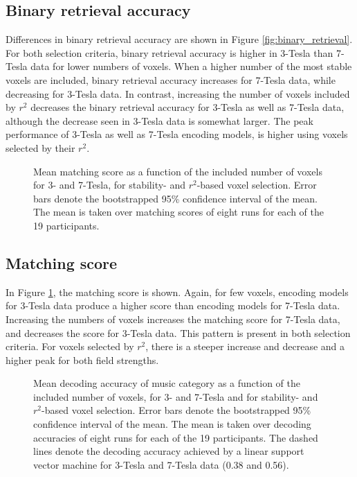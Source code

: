 \subsection*{Binary retrieval accuracy}

Differences in binary retrieval accuracy are shown in Figure \ref{fig:binary_retrieval}. For both selection criteria, binary retrieval
accuracy is higher in 3-Tesla than 7-Tesla data for lower numbers of voxels.
When a higher number of the most stable voxels are included, binary retrieval accuracy increases for 7-Tesla data, while decreasing for 3-Tesla data.    
In contrast, increasing the number of voxels included by $r^2$ decreases the
binary retrieval accuracy for 3-Tesla as well as 7-Tesla data, although the
decrease seen in 3-Tesla data is somewhat larger. The peak
performance of 3-Tesla as well as 7-Tesla encoding models, is higher using
voxels selected by their $r^2$.

\begin{figure}
  \centering
  \def\svgwidth{\linewidth}
  

  \caption{Mean matching score as a function of the included number of
  voxels for 3- and 7-Tesla, for stability- and $r^2$-based voxel selection. Error bars denote the bootstrapped 95\% confidence
  interval of the mean. The mean is taken over matching scores of
  eight runs for each of the 19 participants.}

 \label{fig:matching_scores}
\end{figure}

\subsection*{Matching score}

In Figure \ref{fig:matching_scores}, the matching score is shown. Again, for
few voxels, encoding models for 3-Tesla data produce a higher score than encoding
models for 7-Tesla data. Increasing the numbers of voxels increases the matching
score for 7-Tesla data, and decreases the score for 3-Tesla data. This pattern
is present in both selection criteria. For voxels selected by $r^2$, there is a
steeper increase and decrease and a higher peak for both field strengths.

\begin{figure}
  \centering
  \def\svgwidth{\linewidth}
  

  \caption{Mean decoding accuracy of music category as a function of the included number of
  voxels, for 3- and 7-Tesla and for stability- and $r^2$-based voxel selection. Error bars denote the bootstrapped 95\% confidence
  interval of the mean. The mean is taken over decoding accuracies of
  eight runs for each of the 19 participants. The dashed lines denote the
  decoding accuracy achieved by a linear support vector machine for 3-Tesla
  and 7-Tesla data (0.38 and 0.56).}

 \label{fig:decoding_accuracy}
\end{figure}

